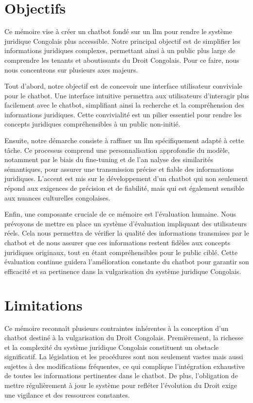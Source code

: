 \section{Objectifs}
Ce mémoire vise à créer un chatbot fondé sur un \ac{llm} pour rendre le système juridique Congolais plus accessible. Notre principal objectif est de simplifier les informations juridiques complexes, permettant ainsi à un public plus large de comprendre les tenants et aboutissants du Droit Congolais. Pour ce faire, nous nous concentrons sur plusieurs axes majeurs.

Tout d'abord, notre objectif est de concevoir une interface utilisateur conviviale pour le chatbot. Une interface intuitive permettra aux utilisateurs d'interagir plus facilement avec le chatbot, simplifiant ainsi la recherche et la compréhension des informations juridiques. Cette convivialité est un pilier essentiel pour rendre les concepts juridiques compréhensibles à un public non-initié.

Ensuite, notre démarche consiste à raffiner un \ac{llm} spécifiquement adapté à cette tâche. Ce processus comprend une personnalisation approfondie du modèle, notamment par le biais du fine-tuning et de l'an nalyse des similarités sémantiques, pour assurer une transmission précise et fiable des informations juridiques. L'accent est mis sur le développement d'un chatbot qui non seulement répond aux exigences de précision et de fiabilité, mais qui est également sensible aux nuances culturelles congolaises.

Enfin, une composante cruciale de ce mémoire est l'évaluation humaine. Nous prévoyons de mettre en place un système d'évaluation impliquant des utilisateurs réels. Cela nous permettra de vérifier la qualité des informations transmises par le chatbot et de nous assurer que ces informations restent fidèles aux concepts juridiques originaux, tout en étant compréhensibles pour le public ciblé. Cette évaluation continue guidera l'amélioration constante du chatbot pour garantir son efficacité et sa pertinence dans la vulgarisation du système juridique Congolais.


\section{Limitations}
\label{ch:0:section:limitaions}

Ce mémoire reconnaît plusieurs contraintes inhérentes à la conception d'un chatbot destiné à la vulgarisation du Droit Congolais. Premièrement, la richesse et la complexité du système juridique Congolais constituent un obstacle significatif. La législation et les procédures sont non seulement vastes mais aussi sujettes à des modifications fréquentes, ce qui complique l'intégration exhaustive de toutes les informations pertinentes dans le chatbot. De plus, l'obligation de mettre régulièrement à jour le système pour refléter l'évolution du Droit exige une vigilance et des ressources constantes.

